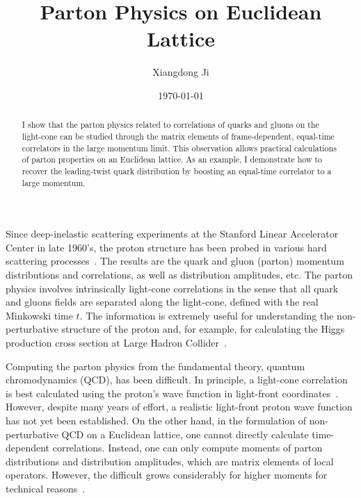 \documentclass[aps,prd,preprint,tightenlines,superscriptaddress]{revtex4}
\begin{document}
\title{Parton Physics on Euclidean Lattice}
\author{Xiangdong Ji}
\date{\today}
\vspace{0.5in}
\begin{abstract}
I show that the parton physics related to correlations of quarks and gluons on the light-cone
can be studied through the matrix elements of frame-dependent, equal-time correlators in
the large momentum limit. This observation allows practical calculations of parton properties
on an Euclidean lattice. As an example, I demonstrate how to recover the leading-twist
quark distribution by boosting an equal-time correlator to a large momentum.

\end{abstract}

\maketitle

Since deep-inelastic scattering experiments at the Stanford Linear Accelerator Center
in late 1960's, the proton structure has been probed in various hard
scattering processes~\cite{Gao:2013xoa}. The results are the quark and gluon (parton) momentum
distributions and correlations, as well as distribution amplitudes, etc. The parton
physics involves intrinsically light-cone correlations in the sense that
all quark and gluons fields are separated along the light-cone, defined with the real
Minkowski time $t$. The information is extremely useful for
understanding the non-perturbative structure of the proton and, for example,
for calculating the Higgs production cross section at Large Hadron Collider~\cite{science}.

Computing the parton physics from the fundamental theory, quantum chromodynamics (QCD),
has been difficult. In principle, a light-cone correlation is best calculated using
the proton's wave function in light-front coordinates~\cite{brodsky}. However, despite many years
of effort, a realistic light-front proton wave function has not yet been established.
On the other hand, in the formulation of non-perturbative QCD on a Euclidean lattice, one cannot directly calculate
time-dependent correlations. Instead, one can only compute moments of parton distributions and distribution amplitudes,
which are matrix elements of local operators. However, the difficult
grows considerably for higher moments for technical reasons~\cite{negele}.
\end{document}

